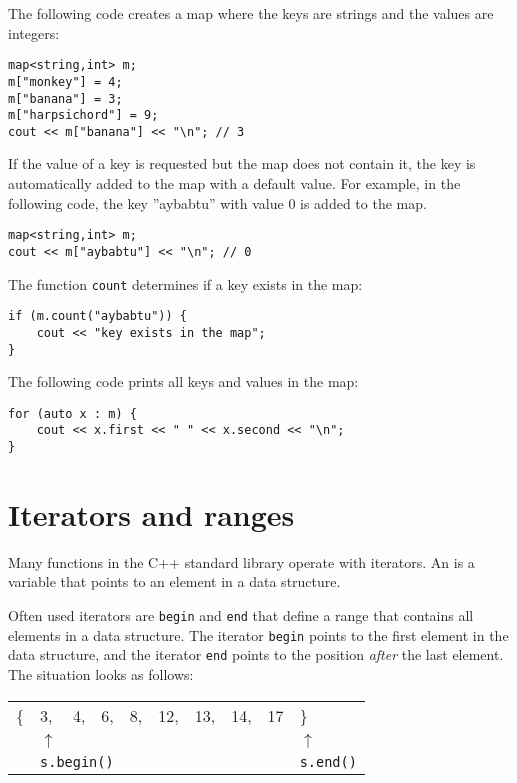 The following code creates a map
where the keys are strings and the values are integers:

\begin{lstlisting}
map<string,int> m;
m["monkey"] = 4;
m["banana"] = 3;
m["harpsichord"] = 9;
cout << m["banana"] << "\n"; // 3
\end{lstlisting}

If the value of a key is requested
but the map does not contain it,
the key is automatically added to the map with
a default value.
For example, in the following code,
the key ''aybabtu'' with value 0
is added to the map.

\begin{lstlisting}
map<string,int> m;
cout << m["aybabtu"] << "\n"; // 0
\end{lstlisting}
The function \texttt{count} determines
if a key exists in the map:
\begin{lstlisting}
if (m.count("aybabtu")) {
    cout << "key exists in the map";
}
\end{lstlisting}
The following code prints all keys and values
in the map:
\begin{lstlisting}
for (auto x : m) {
    cout << x.first << " " << x.second << "\n";
}
\end{lstlisting}

\section{Iterators and ranges}


Many functions in the C++ standard library
operate with iterators.
An  is a variable that points
to an element in a data structure.

Often used iterators are \texttt{begin}
and \texttt{end} that define a range that contains
all elements in a data structure.
The iterator \texttt{begin} points to
the first element in the data structure,
and the iterator \texttt{end} points to
the position \emph{after} the last element.
The situation looks as follows:

\begin{center}
\begin{tabular}{llllllllll}
\{ & 3, & 4, & 6, & 8, & 12, & 13, & 14, & 17 & \} \\
& $\uparrow$ & & & & & & & & $\uparrow$ \\
& \multicolumn{3}{l}{\texttt{s.begin()}} & & & & & & \texttt{s.end()} \\
\end{tabular}
\end{center}

